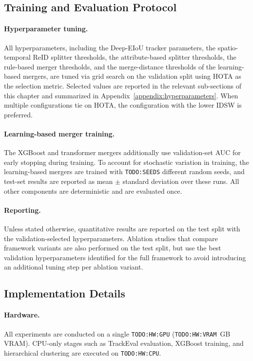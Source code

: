 \subsection{Training and Evaluation Protocol}\label{subsec:protocol}

\paragraph{Hyperparameter tuning.} All hyperparameters, including the Deep-EIoU tracker parameters, the spatio-temporal ReID splitter thresholds, the attribute-based splitter thresholds, the rule-based merger thresholds, and the merge-distance thresholds of the learning-based mergers, are tuned via grid search on the validation split using HOTA as the selection metric. Selected values are reported in the relevant sub-sections of this chapter and summarized in Appendix~\ref{appendix:hyperparameters}. When multiple configurations tie on HOTA, the configuration with the lower IDSW is preferred.

\paragraph{Learning-based merger training.} The XGBoost and transformer mergers additionally use validation-set AUC for early stopping during training. To account for stochastic variation in training, the learning-based mergers are trained with \texttt{TODO:SEEDS} different random seeds, and test-set results are reported as mean $\pm$ standard deviation over these runs. All other components are deterministic and are evaluated once.

\paragraph{Reporting.} Unless stated otherwise, quantitative results are reported on the test split with the validation-selected hyperparameters. Ablation studies that compare framework variants are also performed on the test split, but use the best validation hyperparameters identified for the full framework to avoid introducing an additional tuning step per ablation variant.

\subsection{Implementation Details}\label{subsec:implementation}

\paragraph{Hardware.} All experiments are conducted on a single \texttt{TODO:HW:GPU} (\texttt{TODO:HW:VRAM}~GB VRAM). CPU-only stages such as TrackEval evaluation, XGBoost training, and hierarchical clustering are executed on \texttt{TODO:HW:CPU}.

